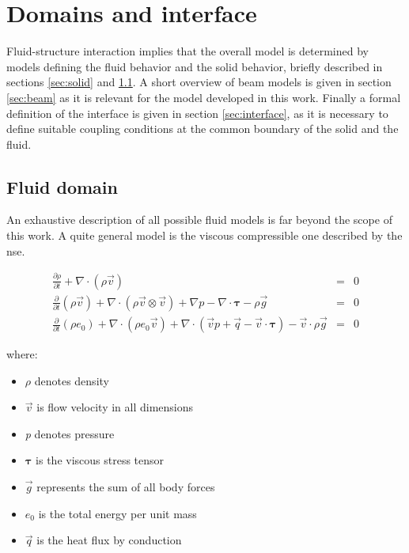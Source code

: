\section{Domains and interface}
\label{sec:models}

Fluid-structure interaction implies that the overall model is determined by models defining the fluid behavior and the solid behavior, briefly described in sections \ref{sec:solid} and \ref{sec:fluid}. A short overview of beam models is given in section \ref{sec:beam} as it is relevant for the model developed in this work.
Finally a formal definition of the interface is given in section \ref{sec:interface}, as it is necessary to define suitable coupling conditions at the common boundary of the solid and the fluid.


\subsection{Fluid domain}
\label{sec:fluid}

An exhaustive description of all possible fluid models is far beyond the scope of this work. A quite general model is the viscous compressible one described by the \acrfull{nse}. 

\begin{subequations}
\begin{eqnarray}
	\label{eq:cont}
	\frac{\partial{\rho}}{\partial{t}} + \nabla \cdot \left(\rho \vec{v}\right) &=&  0 \\	
	\label{eq:mom-cons} 
	\frac{\partial }{\partial t}\left( \rho \vec{v} \right) + \nabla \cdot \left( \rho \vec{v} \otimes \vec{v} \right) +\nabla p - \nabla \cdot \mathbf{\tau} - \rho \vec{g} &=& 0 \\
	\label{eq:energy-cons}
	\frac{\partial }{\partial t}\left( \rho e_0  \right) + \nabla \cdot \left( \rho e_0 \vec{v} \right) + \nabla \cdot \left( \vec{v}p + \vec{q} -\vec{v} \cdot \bm{\tau} \right) - \vec{v} \cdot \rho \vec{g} &=& 0
\end{eqnarray}
\end{subequations}

where:
\begin{itemize}
	\item $\rho$ denotes density
	\item $\vec{v}$ is flow velocity in all dimensions
	\item \textit{p} denotes pressure
	\item $\bm{\tau}$ is the viscous stress tensor
	\item $\vec{g}$ represents the sum of all body forces
	\item $e_0$ is the total energy per unit mass
	\item $\vec{q}$ is the heat flux by conduction
\end{itemize}


